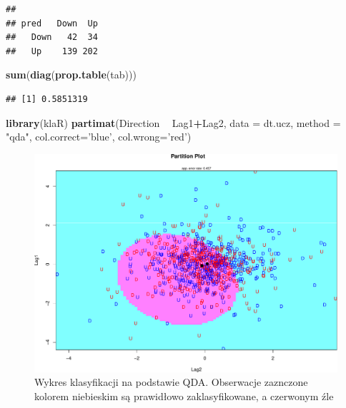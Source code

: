 \documentclass[
]{book}
\newenvironment{Shaded}{\begin{snugshade}}{\end{snugshade}}
\newcommand{\DataTypeTok}[1]{\textcolor[rgb]{0.13,0.29,0.53}{#1}}
\newcommand{\KeywordTok}[1]{\textcolor[rgb]{0.13,0.29,0.53}{\textbf{#1}}}
\newcommand{\NormalTok}[1]{#1}
\newcommand{\OperatorTok}[1]{\textcolor[rgb]{0.81,0.36,0.00}{\textbf{#1}}}
\newcommand{\StringTok}[1]{\textcolor[rgb]{0.31,0.60,0.02}{#1}}
\theoremstyle{plain}
\theoremstyle{definition}
\theoremstyle{definition}
\theoremstyle{definition}
\theoremstyle{definition}
\theoremstyle{remark}
\begin{document}
\begin{Shaded}
\end{Shaded}

\begin{verbatim}
##       
## pred   Down  Up
##   Down   42  34
##   Up    139 202
\end{verbatim}

\begin{Shaded}
\begin{Highlighting}[]
\KeywordTok{sum}\NormalTok{(}\KeywordTok{diag}\NormalTok{(}\KeywordTok{prop.table}\NormalTok{(tab)))}
\end{Highlighting}
\end{Shaded}

\begin{verbatim}
## [1] 0.5851319
\end{verbatim}

\begin{Shaded}
\begin{Highlighting}[]
\KeywordTok{library}\NormalTok{(klaR)}
\KeywordTok{partimat}\NormalTok{(Direction }\OperatorTok{~}\StringTok{ }\NormalTok{Lag1}\OperatorTok{+}\NormalTok{Lag2, }
         \DataTypeTok{data =}\NormalTok{ dt.ucz,}
         \DataTypeTok{method =} \StringTok{"qda"}\NormalTok{,}
         \DataTypeTok{col.correct=}\StringTok{'blue'}\NormalTok{,}
         \DataTypeTok{col.wrong=}\StringTok{'red'}\NormalTok{)}
\end{Highlighting}
\end{Shaded}

\begin{figure}

{\centering \includegraphics{EksploracjaDanych_files/figure-latex/qda-1} 

}

\caption{Wykres klasyfikacji na podstawie QDA. Obserwacje zaznczone kolorem niebieskim są prawidłowo zaklasyfikowane, a czerwonym źle}\label{fig:qda}
\end{figure}
\end{document}
